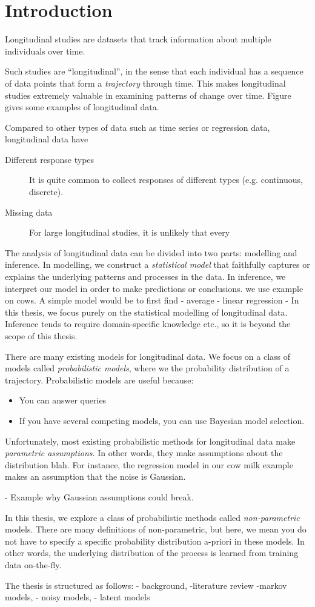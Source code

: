 \chapter{Introduction}

Longitudinal studies are datasets that track information about multiple individuals over time.

Such studies are ``longitudinal'', in the sense that each individual has a sequence of data points that form a \emph{trajectory} through time. This makes longitudinal studies extremely valuable in examining patterns of change over time. Figure gives some examples of longitudinal data.


Compared to other types of data such as time series or regression data, longitudinal data have 
\begin{description}
\item[Different response types] It is quite common to collect responses of different types (e.g. continuous, discrete).
\item[Missing data] For large longitudinal studies, it is unlikely that every 
\end{description}

The analysis of longitudinal data can be divided into two parts: modelling and inference. In modelling, we construct a \emph{statistical model} that faithfully captures or explains the underlying patterns and processes in the data. In inference, we interpret our model in order to make predictions or conclusions. we use 
example on cows. A simple model would be to first find
- average
- linear regression
- In this thesis, we focus purely on the statistical modelling of longitudinal data. Inference tends to require domain-specific knowledge etc., so it is beyond the scope of this thesis.

There are many existing models for longitudinal data. We focus on a class of models called \emph{probabilistic models}, where we the probability distribution of a trajectory. Probabilistic models are useful because:
\begin{itemize}
\item You can answer queries
\item If you have several competing models, you can use Bayesian model selection.
\end{itemize}

Unfortunately, most existing probabilistic methods for longitudinal data make \emph{parametric assumptions}. In other words, they make assumptions about the distribution blah. For instance, the regression model in our cow milk example makes an assumption that the noise is Gaussian.

- Example why Gaussian assumptions could break.

In this thesis, we explore a class of probabilistic methods called \emph{non-parametric} models. There are many definitions of non-parametric, but here, we mean you do not have to specify a specific probability distribution a-priori in these models. In other words, the underlying distribution of the process is learned from training data on-the-fly.

The thesis is structured as follows: - background, -literature review -markov models, - noisy models, - latent models
